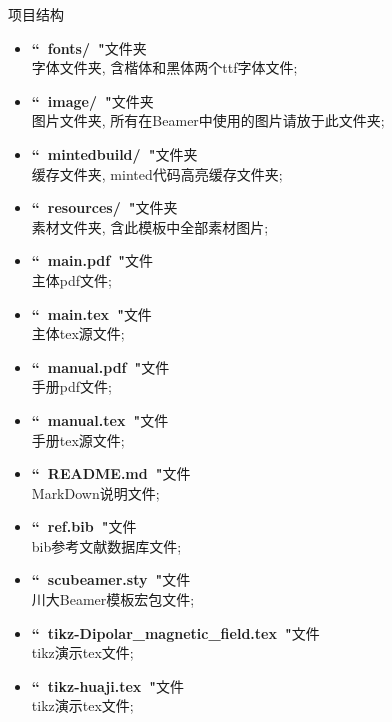 \documentclass[hyperref,UTF8,11pt]{beamer}
\begin{document}
\begin{frame}{项目结构}
	\scriptsize
	\begin{multicols}{2}
	\begin{itemize}
		\item \textbf{``~fonts/~"}\hfill 文件夹\\字体文件夹, 含楷体和黑体两个ttf字体文件;
		\item \textbf{``~image/~"}\hfill 文件夹\\图片文件夹, 所有在Beamer中使用的图片请放于此文件夹;
		\item \textbf{``~mintedbuild/~"}\hfill 文件夹\\缓存文件夹, minted代码高亮缓存文件夹;
		\item \textbf{``~resources/~"}\hfill 文件夹\\素材文件夹, 含此模板中全部素材图片;
		\item \textbf{``~main.pdf~"}\hfill 文件\\主体pdf文件;
		\item \textbf{``~main.tex~"}\hfill 文件\\主体tex源文件;
		\item \textbf{``~manual.pdf~"}\hfill 文件\\手册pdf文件;
		\item \textbf{``~manual.tex~"}\hfill 文件\\手册tex源文件;
		\item \textbf{``~README.md~"}\hfill 文件\\MarkDown说明文件;
		\item \textbf{``~ref.bib~"}\hfill 文件\\bib参考文献数据库文件;
		\item \textbf{``~scubeamer.sty~"}\hfill 文件\\川大Beamer模板宏包文件;
		\item \textbf{``~tikz-Dipolar\_magnetic\_field.tex~"}\hfill 文件\\tikz演示tex文件;
		\item \textbf{``~tikz-huaji.tex~"}\hfill 文件\\tikz演示tex文件;
	\end{itemize}
	\end{multicols}
\end{frame}
\end{document}

